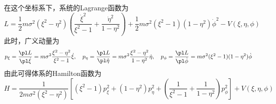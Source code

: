 \begin{example}
在这个坐标系下，系统的Lagrange函数为
\begin{equation}
	L = \frac12 m\sigma^2 (\xi^2-\eta^2)\left(\frac{\dot{\xi}^2}{\xi^2-1} + \frac{\dot{\eta}^2}{1-\eta^2}\right) + \frac12 m\sigma^2(\xi^2-1)(1-\eta^2)\dot{\phi}^2 - V(\xi,\eta,\phi)
	\label{chp3:椭圆坐标下的分离变量-1}
\end{equation}
此时，广义动量为
\begin{equation*}
	p_\xi = \frac{\pl L}{\pl \dot{\xi}} = m\sigma^2 \frac{\xi^2-\eta^2}{\xi^2-1} \dot{\xi},\quad p_\eta = \frac{\pl L}{\pl \dot{\eta}} = m\sigma^2 \frac{\xi^2-\eta^2}{1-\eta^2} \dot{\eta},\quad p_\phi = \frac{\pl L}{\pl \dot{\phi}} = m\sigma^2(\xi^2-1)(1-\eta^2)\dot{\phi}
\end{equation*}
由此可得体系的Hamilton函数为
\begin{equation}
	H = \frac{1}{2m\sigma^2(\xi^2-\eta^2)}\left[(\xi^2-1)p_\xi^2+(1-\eta^2)p_\eta^2+\left(\frac{1}{\xi^2-1}+\frac{1}{1-\eta^2}\right)p_\phi^2\right] + V(\xi,\eta,\phi)
	\label{chp3:椭圆坐标下的分离变量-2}
\end{equation}


\end{example}
